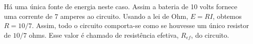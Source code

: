 \documentclass{beamer}
\begin{document}
    \begin{frame}
        \begin{observacao}
            Há uma única fonte de energia neste caso. \pause Assim a bateria de 10 volts fornece uma corrente de 7 amperes ao circuito. \pause Usando a lei de Ohm, $E = RI$, \pause obtemos $R = 10/7$. \pause Assim, todo o circuito comporta-se como se houvesse um único resistor de $10/7$ ohms. \pause Esse valor é chamado de \textrm{resistência efetiva}, \pause $R_{ef}$, do circuito.
        \end{observacao}
    \end{frame}
\end{document}
